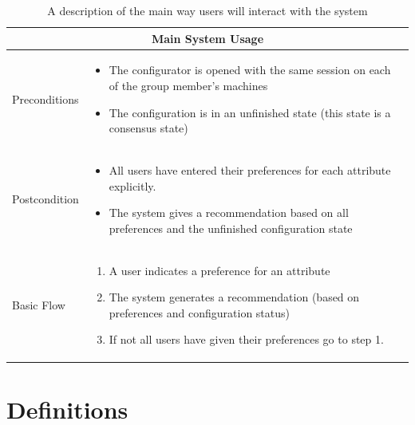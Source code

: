 \documentclass{article}
\begin{document}
\begin{table}
    \begin{center}
        \begin{tabularx}{\columnwidth}{l|X}
            \multicolumn{2}{c}{Main System Usage} \\
            \hline
            Preconditions   & 
                \begin{itemize}
                    \item The configurator is opened with the same session on each of the group member's machines
                    \item The configuration is in an unfinished state (this state is a consensus state)
                \end{itemize} \\
            \hline
            Postcondition   & 
                \begin{itemize}
                    \item All users have entered their preferences for each attribute explicitly.
                    \item The system gives a recommendation based on all preferences and the unfinished configuration state
                \end{itemize} \\
            \hline
            Basic Flow      & 
                \begin{enumerate}
                    \item A user indicates a preference for an attribute
                    \item The system generates a recommendation (based on preferences and configuration status)
                    \item If not all users have given their preferences go to step 1.
                \end{enumerate} \\
            \hline
        \end{tabularx}
        \caption{A description of the main way users will interact with the system}
        \label{tab:MainUseCase}
    \end{center}
\end{table}

\FloatBarrier

\section{Definitions}
\end{document}
